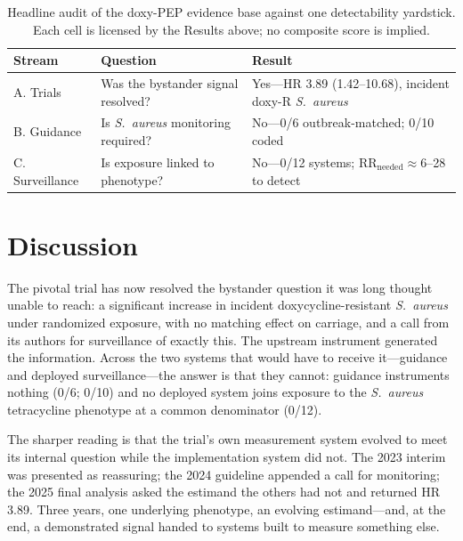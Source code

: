 \documentclass[12pt,a4paper]{article}
\newcommand{\sa}{\emph{S.~aureus}}
\begin{document}
\begin{table}[t]
\centering
\caption{Headline audit of the doxy-PEP evidence base against one detectability
yardstick. Each cell is licensed by the Results above; no composite score is
implied.}
\label{tab:audit}
\small
\begin{tabularx}{\textwidth}{@{}lXl@{}}
\toprule
Stream & Question & Result\\
\midrule
A. Trials & Was the bystander signal resolved? & Yes---HR 3.89 (1.42--10.68), incident doxy-R \sa{}\\
B. Guidance & Is \sa{} monitoring required? & No---0/6 outbreak-matched; 0/10 coded\\
C. Surveillance & Is exposure linked to phenotype? & No---0/12 systems; RR$_{\text{needed}}\approx$6--28 to detect\\
\bottomrule
\end{tabularx}
\end{table}

\section*{Discussion}

The pivotal trial has now resolved the bystander question it was long thought
unable to reach: a significant increase in incident doxycycline-resistant \sa{}
under randomized exposure, with no matching effect on carriage, and a call from
its authors for surveillance of exactly this.\cite{luetkemeyer2025} The upstream
instrument generated the information. Across the two systems that would have to
receive it---guidance and deployed surveillance---the answer is that they cannot:
guidance instruments nothing (0/6; 0/10) and no deployed system joins exposure to
the \sa{} tetracycline phenotype at a common denominator (0/12).

The sharper reading is that the trial's own measurement system evolved to meet
its internal question while the implementation system did not. The 2023 interim
was presented as reassuring; the 2024 guideline appended a call
for monitoring; the 2025 final analysis asked the estimand the others had not and
returned HR 3.89. Three years, one underlying phenotype, an evolving
estimand\cite{montoya2025estimand}---and, at the end, a demonstrated signal handed
to systems built to measure something else.
\end{document}
